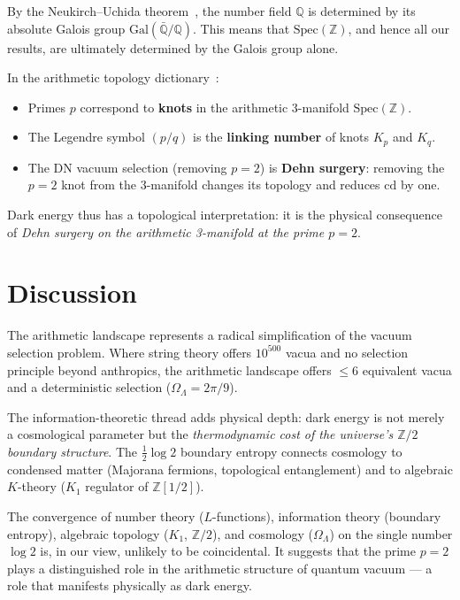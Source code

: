 \documentclass[11pt,a4paper]{article}
\begin{document}
By the Neukirch--Uchida theorem~\cite{NeukrichUchida}, the
number field $\mathbb{Q}$ is determined by its absolute Galois
group $\mathrm{Gal}(\bar{\mathbb{Q}}/\mathbb{Q})$. This means
that $\mathrm{Spec}(\mathbb{Z})$, and hence all our results, are
ultimately determined by the Galois group alone.

In the arithmetic topology dictionary~\cite{Morishita2012}:
\begin{itemize}
\item Primes $p$ correspond to \textbf{knots} in the
arithmetic 3-manifold $\mathrm{Spec}(\mathbb{Z})$.
\item The Legendre symbol $(p/q)$ is the \textbf{linking number}
of knots $K_p$ and $K_q$.
\item The DN vacuum selection (removing $p = 2$) is
\textbf{Dehn surgery}: removing the $p = 2$ knot from the
3-manifold changes its topology and reduces $\mathrm{cd}$ by one.
\end{itemize}

Dark energy thus has a topological interpretation:
it is the physical consequence of \emph{Dehn surgery on the
arithmetic 3-manifold at the prime $p = 2$}.

\section{Discussion}

The arithmetic landscape represents a radical simplification of
the vacuum selection problem. Where string theory offers
$10^{500}$ vacua and no selection principle beyond anthropics,
the arithmetic landscape offers $\leq 6$ equivalent vacua and a
deterministic selection ($\Omega_\Lambda = 2\pi/9$).

The information-theoretic thread adds physical depth: dark energy
is not merely a cosmological parameter but the
\emph{thermodynamic cost of the universe's $\mathbb{Z}/2$
boundary structure}. The $\frac{1}{2}\log 2$ boundary entropy
connects cosmology to condensed matter (Majorana fermions,
topological entanglement) and to algebraic $K$-theory ($K_1$
regulator of $\mathbb{Z}[1/2]$).

The convergence of number theory ($L$-functions), information
theory (boundary entropy), algebraic topology ($K_1$,
$\mathbb{Z}/2$), and cosmology ($\Omega_\Lambda$) on the single
number $\log 2$ is, in our view, unlikely to be coincidental.
It suggests that the prime $p = 2$ plays a distinguished role
in the arithmetic structure of quantum vacuum --- a role that
manifests physically as dark energy.
\end{document}
